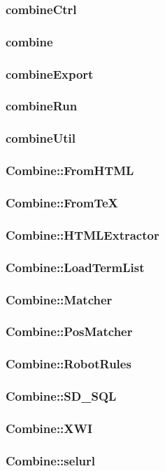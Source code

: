 \subsubsection{combineCtrl}

\subsubsection{combine}

\subsubsection{combineExport}

\subsubsection{combineRun}

\subsubsection{combineUtil}

\subsubsection{Combine::FromHTML}

\subsubsection{Combine::FromTeX}

\subsubsection{Combine::HTMLExtractor}

\subsubsection{Combine::LoadTermList}

\subsubsection{Combine::Matcher}

\subsubsection{Combine::PosMatcher}

\subsubsection{Combine::RobotRules}

\subsubsection{Combine::SD\_SQL}

\subsubsection{Combine::XWI}

\subsubsection{Combine::selurl}

